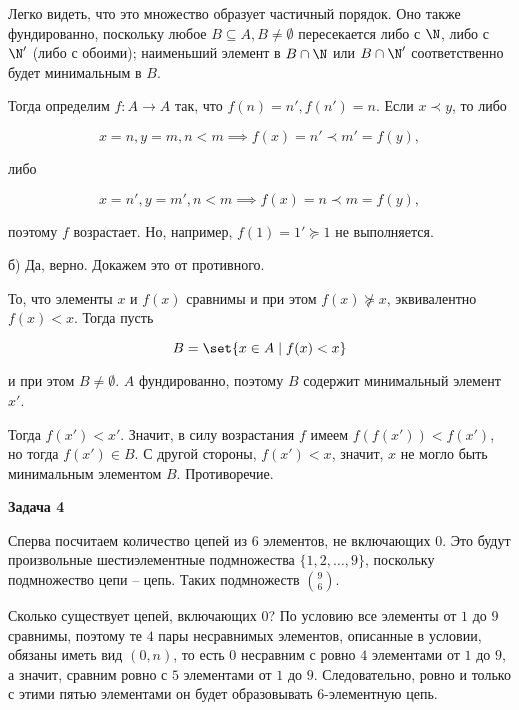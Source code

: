 		Легко видеть, что это множество образует частичный порядок. Оно также фундированно, поскольку любое $B \subseteq A, B \ne \emptyset$ пересекается либо с $\N$, либо с $\N'$ (либо с обоими); наименьший элемент в $B \cap \N$ или $B \cap \N'$ соответственно будет минимальным в $B$.

		Тогда определим $f: A \to A$ так, что $f(n) = n', f(n') = n$. Если $x \prec y$, то либо

		\begin{equation*}
			x = n, y = m, n < m \implies f(x) = n' \prec m' = f(y),
		\end{equation*}

		либо

		\begin{equation*}
			x = n', y = m', n < m \implies f(x) = n \prec m = f(y),
		\end{equation*}

		поэтому $f$ возрастает. Но, например, $f(1) = 1' \succeq 1$ не выполняется.

		б) Да, верно. Докажем это от противного.

		То, что элементы $x$ и $f(x)$ сравнимы и при этом $f(x) \not\succeq x$, эквивалентно $f(x) < x$. Тогда пусть

		\begin{equation*}
			B = \set{x \in A \mid f(x) < x}
		\end{equation*}

		и при этом $B \ne \emptyset$. $A$ фундированно, поэтому $B$ содержит минимальный элемент $x'$.

		Тогда $f(x') < x'$. Значит, в силу возрастания $f$ имеем $f(f(x')) < f(x')$, но тогда $f(x') \in B$. С другой стороны, $f(x') < x$, значит, $x$ не могло быть минимальным элементом $B$. Противоречие.


	\begin{center}
    \textbf{Задача 4}
\end{center}
		Сперва посчитаем количество цепей из $6$ элементов, не включающих $0$. Это будут произвольные шестиэлементные подмножества $\{1, 2, \dots, 9\}$, поскольку подмножество цепи -- цепь. Таких подмножеств $\binom{9}{6}$.

		Сколько существует цепей, включающих $0$? По условию все элементы от $1$ до $9$ сравнимы, поэтому те $4$ пары несравнимых элементов, описанные в условии, обязаны иметь вид $(0, n)$, то есть $0$ несравним с ровно $4$ элементами от $1$ до $9$, а значит, сравним ровно с $5$ элементами от $1$ до $9$. Следовательно, ровно и только с этими пятью элементами он будет образовывать $6$-элементную цепь.

